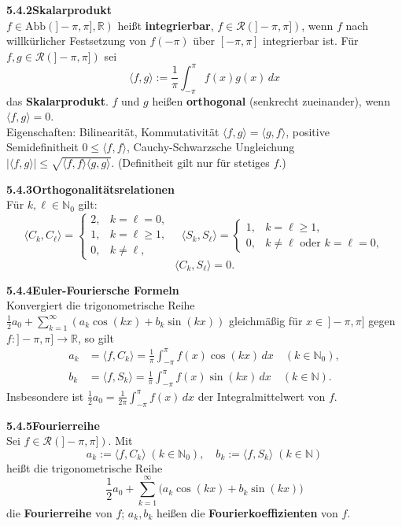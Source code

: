 \documentclass[a4paper,12pt]{article}
\newcommand{\gentry}[3]{%
  \noindent\textbf{#1\quad #2}\nopagebreak\\[0.2em]
  #3\par\smallskip
}
\begin{document}
\gentry{5.4.2}{Skalarprodukt}{%
  $f \in \mathrm{Abb}(]-\pi,\pi], \mathbb{R})$ heißt \textbf{integrierbar},
  $f \in \mathcal{R}(]-\pi,\pi])$, wenn $f$ nach willkürlicher Festsetzung von
  $f(-\pi)$ über $[-\pi,\pi]$ integrierbar ist. Für $f, g \in \mathcal{R}(]-\pi,\pi])$
  sei
  \[
    \langle f, g \rangle := \frac{1}{\pi} \int_{-\pi}^\pi f(x) g(x)\,dx
  \]
  das \textbf{Skalarprodukt}. $f$ und $g$ heißen \textbf{orthogonal}
  (senkrecht zueinander), wenn $\langle f, g \rangle = 0$.\\
  Eigenschaften: Bilinearität, Kommutativität $\langle f,g \rangle = \langle g,f\rangle$,
  positive Semidefinitheit $0 \leq \langle f, f \rangle$, Cauchy-Schwarzsche
  Ungleichung $|\langle f,g\rangle| \leq \sqrt{\langle f,f\rangle\langle g,g\rangle}$.
  (Definitheit gilt nur für stetiges $f$.)
}

\gentry{5.4.3}{Orthogonalitätsrelationen}{%
  Für $k, \ell \in \mathbb{N}_0$ gilt:
  \[
    \langle C_k, C_\ell \rangle =
    \begin{cases} 2, & k=\ell=0,\\ 1, & k=\ell \geq 1,\\ 0, & k\neq\ell,\end{cases}
    \quad
    \langle S_k, S_\ell \rangle =
    \begin{cases} 1, & k=\ell \geq 1,\\ 0, & k\neq\ell \text{ oder } k=\ell=0,\end{cases}
  \]
  \[
    \langle C_k, S_\ell \rangle = 0.
  \]
}

\gentry{5.4.4}{Euler-Fouriersche Formeln}{%
  Konvergiert die trigonometrische Reihe $\frac{1}{2}a_0 + \sum_{k=1}^\infty (a_k \cos(kx) + b_k \sin(kx))$
  gleichmäßig für $x \in\,]-\pi,\pi]$ gegen $f: ]-\pi,\pi] \to \mathbb{R}$, so gilt
  \begin{align*}
    a_k &= \langle f, C_k \rangle = \frac{1}{\pi} \int_{-\pi}^\pi f(x) \cos(kx)\,dx \quad (k \in \mathbb{N}_0),\\
    b_k &= \langle f, S_k \rangle = \frac{1}{\pi} \int_{-\pi}^\pi f(x) \sin(kx)\,dx \quad (k \in \mathbb{N}).
  \end{align*}
  Insbesondere ist $\frac{1}{2} a_0 = \frac{1}{2\pi}\int_{-\pi}^\pi f(x)\,dx$ der
  Integralmittelwert von $f$.
}

\gentry{5.4.5}{Fourierreihe}{%
  Sei $f \in \mathcal{R}(]-\pi,\pi])$. Mit
  \[
    a_k := \langle f, C_k \rangle \; (k \in \mathbb{N}_0), \quad
    b_k := \langle f, S_k \rangle \; (k \in \mathbb{N})
  \]
  heißt die trigonometrische Reihe
  \[
    \frac{1}{2} a_0 + \sum_{k=1}^\infty \bigl(a_k \cos(kx) + b_k \sin(kx)\bigr)
  \]
  die \textbf{Fourierreihe} von $f$; $a_k, b_k$ heißen die
  \textbf{Fourierkoeffizienten} von $f$.
}
\end{document}

